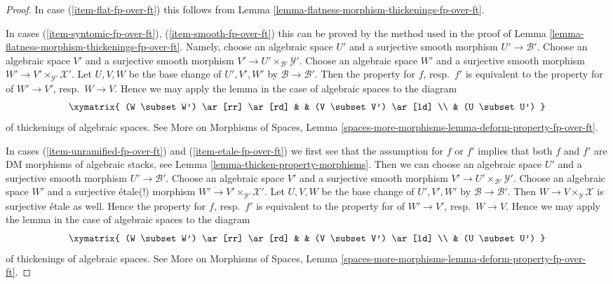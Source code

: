\begin{proof}
In case (\ref{item-flat-fp-over-ft}) this follows from
Lemma \ref{lemma-flatness-morphism-thickenings-fp-over-ft}.

\medskip\noindent
In cases
(\ref{item-syntomic-fp-over-ft}), (\ref{item-smooth-fp-over-ft})
this can be proved by the method used in the proof of
Lemma \ref{lemma-flatness-morphism-thickenings-fp-over-ft}.
Namely, choose an algebraic space $U'$ and a surjective smooth morphism
$U' \to \mathcal{B}'$.
Choose an algebraic space $V'$ and a surjective smooth morphism
$V' \to U' \times_{\mathcal{B}'} \mathcal{Y}'$.
Choose an algebraic space $W'$ and a surjective smooth morphism
$W' \to V' \times_{\mathcal{Y}'} \mathcal{X}'$. Let $U, V, W$
be the base change of $U', V', W'$ by $\mathcal{B} \to \mathcal{B}'$.
Then the property for $f$, resp.\ $f'$
is equivalent to the property for of $W' \to V'$, resp.\ $W \to V$.
Hence we may apply the lemma in the case of algebraic spaces to the
diagram
$$
\xymatrix{
(W \subset W') \ar[rr] \ar[rd] & & (V \subset V') \ar[ld] \\
& (U \subset U')
}
$$
of thickenings of algebraic spaces. See
More on Morphisms of Spaces, Lemma
\ref{spaces-more-morphisms-lemma-deform-property-fp-over-ft}.

\medskip\noindent
In cases (\ref{item-unramified-fp-over-ft}) and (\ref{item-etale-fp-over-ft})
we first see that the assumption for $f$ or $f'$ implies that both
$f$ and $f'$ are DM morphisms of algebraic stacks, see
Lemma \ref{lemma-thicken-property-morphisms}. Then we can choose
an algebraic space $U'$ and a surjective smooth morphism
$U' \to \mathcal{B}'$.
Choose an algebraic space $V'$ and a surjective smooth morphism
$V' \to U' \times_{\mathcal{B}'} \mathcal{Y}'$.
Choose an algebraic space $W'$ and a surjective \'etale(!) morphism
$W' \to V' \times_{\mathcal{Y}'} \mathcal{X}'$. Let $U, V, W$
be the base change of $U', V', W'$ by $\mathcal{B} \to \mathcal{B}'$.
Then $W \to V \times_\mathcal{Y} \mathcal{X}$ is surjective
\'etale as well. Hence the property for $f$, resp.\ $f'$
is equivalent to the property for of $W' \to V'$, resp.\ $W \to V$.
Hence we may apply the lemma in the case of algebraic spaces to the
diagram
$$
\xymatrix{
(W \subset W') \ar[rr] \ar[rd] & & (V \subset V') \ar[ld] \\
& (U \subset U')
}
$$
of thickenings of algebraic spaces. See
More on Morphisms of Spaces, Lemma
\ref{spaces-more-morphisms-lemma-deform-property-fp-over-ft}.


\end{proof}
